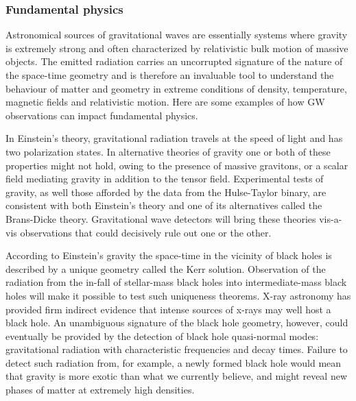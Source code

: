 \subsubsection{Fundamental physics}
Astronomical sources of gravitational waves are essentially 
systems where gravity is extremely strong and often 
characterized by relativistic bulk motion of massive objects. 
The emitted radiation carries an uncorrupted signature of the 
nature of the space-time geometry and is therefore an invaluable 
tool to understand the behaviour of matter and geometry in 
extreme conditions of density, temperature, magnetic fields 
and relativistic motion. Here are some examples of how GW 
observations can impact fundamental physics. 

In Einstein's theory, gravitational radiation travels at the 
speed of light and has two polarization states. In alternative 
theories of gravity one or both of these properties might not
hold, owing to the presence of massive gravitons, or a scalar 
field mediating gravity in addition to the tensor field. Experimental 
tests of gravity, as well those afforded by the data from the 
Hulse-Taylor binary, are consistent with both Einstein's theory 
and one of its alternatives called the Brans-Dicke theory. 
Gravitational wave detectors will bring these theories 
vis-a-vis observations that could decisively rule out one 
or the other. 

According to Einstein's gravity the space-time in the vicinity 
of black holes is described by a unique geometry called the 
Kerr solution. Observation of the radiation from the in-fall 
of stellar-mass black holes into intermediate-mass black holes 
will make it possible to test such uniqueness theorems. X-ray 
astronomy has provided firm indirect evidence that intense 
sources of x-rays may well host a black hole. An unambiguous 
signature of the black hole geometry, however, could eventually 
be provided by the detection of black hole quasi-normal modes: 
gravitational radiation with characteristic frequencies and decay 
times. 
Failure to detect such radiation from, for example, a newly 
formed black hole would mean that gravity is more exotic than 
what we currently believe, 
and might reveal new phases of matter at extremely high densities. 

